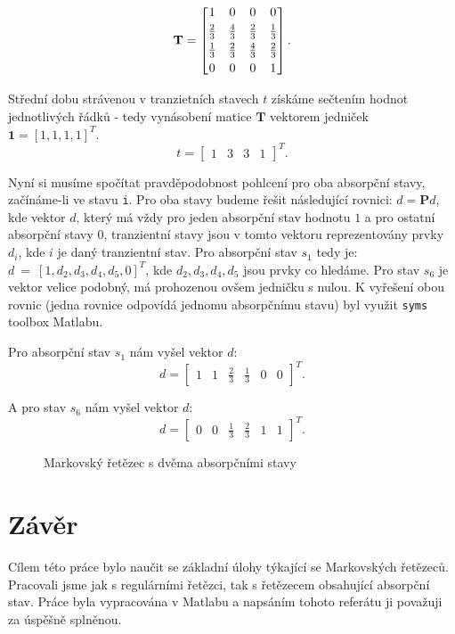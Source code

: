 \documentclass{article}
\begin{document}
\[
\mathbf{T} =
\begin{bmatrix}
1 & 0 & 0 & 0 \\
\addlinespace[3pt]
\frac{2}{3} & \frac{4}{3} & \frac{2}{3} & \frac{1}{3} \\
\addlinespace[3pt]
\frac{1}{3} & \frac{2}{3} & \frac{4}{3} & \frac{2}{3} \\
\addlinespace[3pt]
0 & 0 & 0 & 1 \\
\end{bmatrix}.
\]

Střední dobu strávenou v tranzietních stavech $t$ získáme sečtením hodnot jednotlivých řádků - tedy vynásobení matice $\mathbf{T}$ vektorem jedniček $\mathbf{1} = [1, 1, 1, 1]^T$.
\[
t = 
\begin{bmatrix}
    1 & 3 & 3 & 1
\end{bmatrix}^T.
\]

Nyní si musíme spočítat pravděpodobnost pohlcení pro oba absorpční stavy, začínáme-li ve stavu \verb|i|.
Pro oba stavy budeme řešit následující rovnici: $d = \mathbf{P} d$, kde vektor $d$, který má vždy pro jeden absorpční stav hodnotu $1$ a pro ostatní absorpční stavy $0$, tranzientní stavy jsou v tomto vektoru reprezentovány prvky $d_i$, kde $i$ je daný tranzientní stav. 
Pro absorpční stav $s_1$ tedy je:\linebreak  $d~=~[1, d_2, d_3, d_4, d_5, 0]^T$, kde $d_2, d_3, d_4, d_5$ jsou prvky co hledáme. Pro stav $s_6$ je vektor velice podobný, má prohozenou ovšem jedničku s nulou.
K vyřešení obou rovnic (jedna rovnice odpovídá jednomu absorpčnímu stavu) byl využit \verb|syms| toolbox Matlabu.

Pro absorpční stav $s_1$ nám vyšel vektor $d$:
\[
d = 
\begin{bmatrix}
    1 & 1 &\frac 2 3 & \frac 1 3 & 0 & 0
\end{bmatrix}^T.
\]

A pro stav $s_6$ nám vyšel vektor $d$:
\[
d = 
\begin{bmatrix}
    0 & 0 & \frac 1 3 & \frac 2 3 & 1 & 1
\end{bmatrix}^T.
\]


\begin{figure}
\centering
{}
\caption{Markovský řetězec s dvěma absorpčními stavy}
\label{fig:markov_chain_2}
\end{figure}
\clearpage
\section{Závěr}
Cílem této práce bylo naučit se základní úlohy týkající se Markovských řetězeců. Pracovali jsme jak s regulárními řetězci, tak s řetězecem obsahující absorpční stav. 
Práce byla vypracována v Matlabu a napsáním tohoto referátu ji považuji za úspěšně splněnou.
\end{document}
